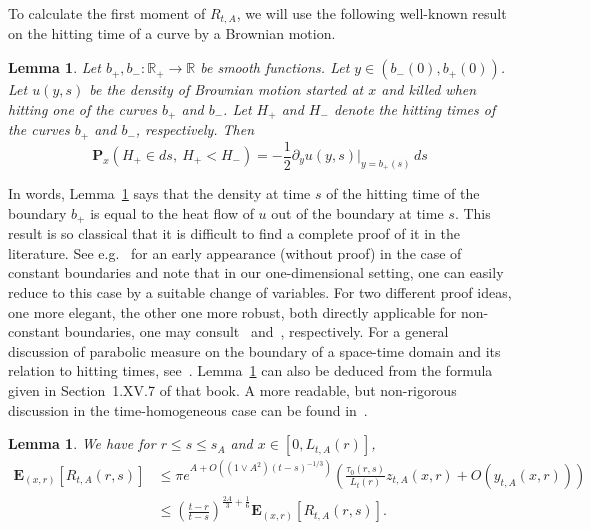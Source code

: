 \documentclass[10pt]{amsart}
\newtheorem{lemm}[theo]{Lemma}\newtheorem{prop}[theo]{Proposition}\newtheorem{coro}[theo]{Corollary}\newtheorem{conj}[theo]{Conjecture}
\theoremstyle{definition}\newtheorem{defi}[theo]{Definition}\newtheorem{rema}[theo]{Remark}\newtheorem{exam}[theo]{Example}\newtheorem{exem}[theo]{Example}\newtheorem{nota}[theo]{Notation}
\newcommand*\E{\mathbf{E}}
\renewcommand*\P{\mathbf{P}}
\newcommand*\R{\mathbb{R}}
\newcommand{\1} {\mathds{1}}
\renewcommand*\to{\rightarrow}
\begin{document}
To calculate the first moment of $R_{t,A}$, we will use the following well-known result on the hitting time of a curve by a Brownian motion.

\begin{lemm}\label{lem:heat_flow}
Let $b_+,b_-:\R_+\to\R$ be smooth functions. Let $y \in (b_-(0),b_+(0))$. Let $u(y,s)$ be the density of Brownian motion started at $x$ and killed when hitting one of the curves $b_+$ and $b_-$. Let $H_+$ and $H_-$ denote the hitting times of the curves $b_+$ and $b_-$, respectively. Then
\[
\P_x\left(H_+ \in ds,\ H_+ < H_-\right) = - \frac 1 2 \partial_y u(y,s)\Big|_{y = b_+(s)}\, ds
\]
\end{lemm}

In words, Lemma~\ref{lem:heat_flow} says that the density at time $s$ of the hitting time of the boundary $b_+$ is equal to the heat flow of $u$ out of the boundary at time $s$. This result is so classical that it is difficult to find a complete proof of it in the literature. See e.g.~\cite[p.~154, eq.~32]{ito_mckean} for an early appearance (without proof) in the case of constant boundaries and note that in our one-dimensional setting, one can easily reduce to this case by a suitable change of variables. For two different proof ideas, one more elegant, the other one more robust, both directly applicable for non-constant boundaries, one may consult~\cite[Lemma~I.1.4]{lerche} and~\cite[Section~3]{daniels}, respectively. For a general discussion of parabolic measure on the boundary of a space-time domain and its relation to hitting times, see~\cite[Section~2.IX.13]{doob}. Lemma~\ref{lem:heat_flow} can also be deduced from the formula given in Section~1.XV.7 of that book. A more readable, but non-rigorous discussion in the time-homogeneous case can be found in~\cite[Section~5.2.1]{gardiner}.

\begin{lemm}\label{lem:Rexp}
We have for $r\le s\le s_A$ and $x\in [0,L_{t,A}(r)]$,
\begin{equation}\label{Rexp1}
\begin{split}
\E_{(x,r)}\left[R_{t,A}(r,s)\right] &\leq \pi e^{A + O\left(\left(1 \vee A^2\right)(t - s)^{-1/3}\right)} \left(\frac{\tau_0(r,s)}{L_t(r)} z_{t,A}(x,r) + O\left(y_{t,A}(x,r)\right)\right)\\
&\leq \left(\frac{t-r}{t-s}\right)^{\frac{2A} 3 + \frac 1 6}\E_{(x,r)}\left[R_{t,A}(r,s)\right].
\end{split}
\end{equation}
\end{lemm}
\end{document}
